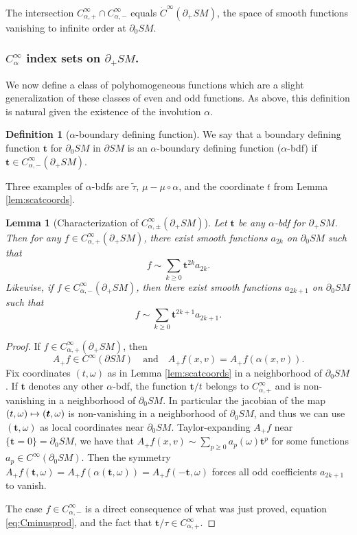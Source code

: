 \documentclass[JEP,XML,SOM,Unicode,NoFloatCountersInSection, NoEqCountersInSection,published]{cedram}
\def\mto{\mathchoice{\longmapsto}{\mapsto}{\mapsto}{\mapsto}}
\theoremstyle{plain}
\newtheorem{Lemma}[Theorem]{Lemma}
\theoremstyle{definition}
\newtheorem{Definition}[Theorem]{Definition}
\theoremstyle{remark}
\def\t{\tilde{\tau}}
\newcommand{\bt}{{\boldsymbol{t}}}
\newcommand{\del}{\partial}
\begin{document}
The intersection $C_{\alpha,+}^\infty\cap C_{\alpha,-}^\infty$ equals $\dot C^\infty(\partial_+ SM)$, the space of
smooth functions vanishing to infinite order at $\partial_0 SM$.

\subsubsection*{$C_\alpha^\infty$ index sets on $\partial_+ SM$.} We now define a class of polyhomogeneous functions which are a slight generalization of these classes of even and odd functions. As above, this definition is natural given the existence of the involution $\alpha$.

\begin{Definition}[$\alpha$-boundary defining function]
We say that a boundary defining function $\bt$ for $\del_0 SM$ in $\del SM$ is an $\alpha$-boundary defining function ($\alpha$-bdf) if $\bt\in C_{\alpha,-}^\infty(\del_+ SM)$.
\end{Definition}
Three examples of $\alpha$-bdfs are $\t$, $\mu - \mu \circ \alpha$, and the coordinate $t$ from Lemma \ref{lem:scatcoords}.

\begin{Lemma}[Characterization of $C_{\alpha,\pm}^\infty(\partial_+ SM)$]\label{lem:bdfexpansion}
Let $\bt$ be any $\alpha$-bdf for $\partial_+ SM$. Then for any $f\in C^\infty_{\alpha,+} (\partial_+ SM)$, there exist smooth functions $a_{2k}$ on $\partial_0 SM$ such that
\begin{equation*}
f \sim \sum_{k\ge 0} \bt^{2k} a_{2k}.
\end{equation*}
Likewise, if $f\in C^\infty_{\alpha,-} (\partial_+ SM)$, then there exist smooth functions $a_{2k+1}$ on $\partial_0 SM$ such that
\begin{equation*}
f \sim \sum_{k\ge 0} \bt^{2k+1} a_{2k+1}.
\end{equation*}
\end{Lemma}
\begin{proof}
If $f\in C_{\alpha,+}^\infty(\partial_+ SM)$, then
\[
A_+ f\in C^\infty(\partial SM)\quad\text{and}\quad A_+ f(x,v) = A_+ f(\alpha(x,v)).
\]
Fix coordinates $(t,\omega)$ as in Lemma \ref{lem:scatcoords} in a neighborhood of $\partial_0 SM$. If $\bt$ denotes any other $\alpha$-bdf, the function $\bt/t$ belongs to $C_{\alpha,+}^\infty$ and is non-vanishing in a neighborhood of $\partial_0 SM$. In particular the jacobian of the map $(t,\omega)\mto (\bt,\omega)$ is non-vanishing in a neighborhood of $\partial_0 SM$, and thus we can use $(\bt,\omega)$ as local coordinates near $\partial_0 SM$. Taylor-expanding $A_+ f$ near $\{ \bt =0 \} = \partial_0 SM$, we have that $A_+ f(x,v) \sim \sum_{p\ge 0} a_p(\omega) \bt^p$ for some functions $a_p\in C^\infty(\partial_0 SM)$. Then the symmetry $A_+ f(\bt,\omega) = A_+ f(\alpha(\bt,\omega)) = A_+ f (-\bt,\omega)$ forces all odd coefficients $a_{2k+1}$ to vanish.

The case $f\in C_{\alpha,-}^\infty$ is a direct consequence of what was just proved, equation \eqref{eq:Cminusprod}, and the fact that $\bt/\tau\in C^{\infty}_{\alpha,+}$.
\end{proof}
\end{document}
